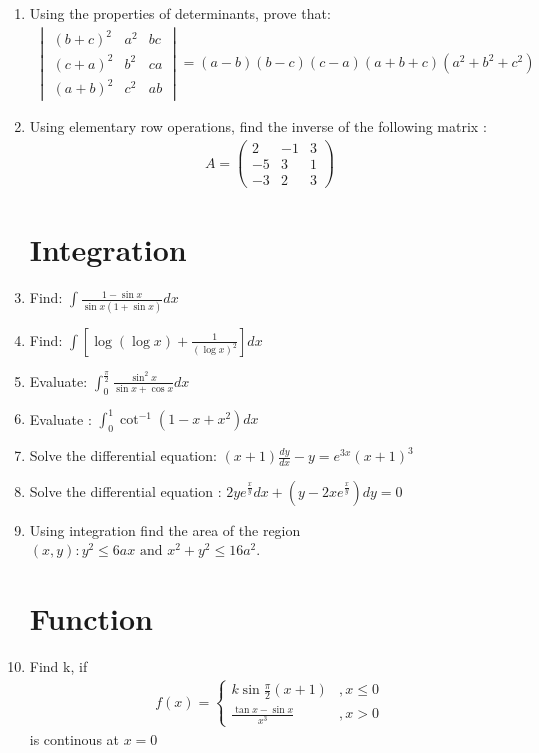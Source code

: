 \documentclass[12pt,-letter paper]{article}
\newcommand{\myvec}[1]{\ensuremath{\begin{pmatrix}#1\end{pmatrix}}}
\newcommand{\mydet}[1]{\ensuremath{\begin{vmatrix}#1\end{vmatrix}}}
\providecommand{\brak}[1]{\ensuremath{\left(#1\right)}}
\providecommand{\sbrak}[1]{\ensuremath{{}\left[#1\right]}}
\providecommand{\brak}[1]{\ensuremath{\left(#1\right)}}
\begin{document}
\begin{enumerate}
	\item Using the properties of determinants, prove that:
	\begin{align}
		\mydet{(b+c)^2 & a^2 & bc \\
		(c+a)^2 & b^2 & ca\\
		(a+b)^2 & c^2 & ab} = (a - b) (b-c) (c-a) (a+b+c) (a^2 + b^2 + c^2)
	\end{align}
	
	\item Using elementary row operations, find the inverse of the following matrix :
	\begin{align}
		A = \myvec{2 & -1 & 3\\
		-5 & 3 & 1 \\
		-3 & 2 & 3}
	\end{align}

\section{Integration}
	\item Find: $\int \frac{1- \sin x}{\sin x (1 + \sin x)} dx$

	\item Find: $\int \sbrak{\log (\log x)+ \frac{1}{(\log x)^2}} dx$

	\item Evaluate: $\int_0^\frac{\pi}{2} \frac{\sin^2x}{\sin x + \cos x} dx$

	\item Evaluate : $ \int_0^1 \cot^{-1}\brak{1 - x + x^2} dx$

	\item Solve the differential equation: $(x + 1) \frac{dy}{dx} - y = e^{3x} (x + 1)^3$ 

	\item Solve the differential equation : $2y e^{\frac{x}{y}}dx + \brak{y - 2x e^{\frac{x}{y}}}dy = 0$

	\item Using integration find the area of the region ${(x, y) : y^2 \leq 6ax \text{ and }
 x^2+y^2 \leq 16a^2}$.


\section{Function}
	\item Find k, if 
	\begin{align}
		f(x) = \begin{cases} k\sin \frac{\pi}{2}(x+1) &,x \leq 0\\
		\frac{\tan x - \sin x}{x^3} &, x>0
		\end{cases}
	\end{align}
is continous at $x=0$
	

\end{enumerate}
\end{document}
